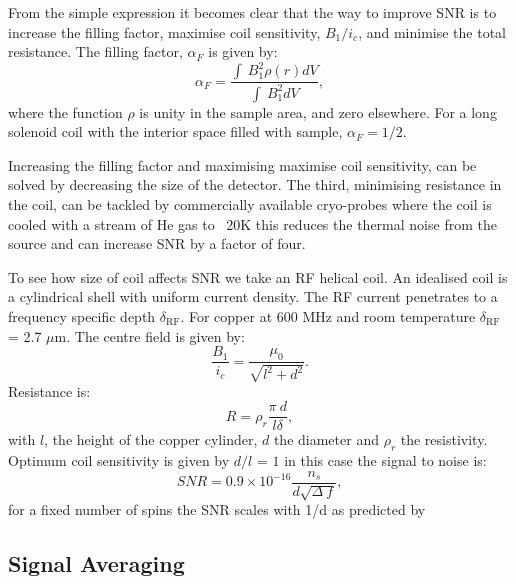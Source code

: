 From the simple expression it becomes clear that the way to improve SNR is to increase the filling factor, maximise coil sensitivity,
$B_1/i_c$, and minimise the total resistance. The filling factor, $\alpha_F$ is given by:
\begin{equation}\label{eqn:FillingFactor}
  \alpha_F = \frac{\int~B_1^2\rho(r)dV}{\int~B_1^2dV},
\end{equation}
where the function $\rho$ is unity in the sample area, and zero elsewhere. For a long solenoid coil with the
interior space filled with sample, $\alpha_F = 1/2$.

Increasing the filling factor and maximising maximise coil sensitivity, can be solved by decreasing the size of
the detector. The third, minimising resistance in the coil,
can be tackled by commercially available cryo-probes where the coil is cooled with a stream of He gas to
~20K this reduces the thermal noise from the source and can increase SNR by a factor of four.

To see how size of coil affects SNR we take an RF helical coil. An idealised coil
is a cylindrical shell with uniform current density. The RF current penetrates to a frequency
specific depth $\delta_{\text{RF}}$. For copper at 600 MHz and room temperature $\delta_{\text{RF}}$ = 2.7 $\mu$m. The centre
field is given by:
\begin{equation}
  \frac{B_1}{i_c} = \frac{\mu_0}{\sqrt{l^2+d^2}}.
\end{equation}
Resistance is:
\begin{equation}
  R = \rho_r\frac{\pi~d}{l\delta},
\end{equation}
with $l$, the height of the copper cylinder, $d$ the diameter and $\rho_r$ the resistivity.
Optimum coil sensitivity is given by $d/l$ = $1$ in this case the signal to noise is:
\begin{equation}\label{eqn:1/d}
  SNR = 0.9\times10^{-16}\frac{n_s}{d\sqrt{\Delta~f}},
\end{equation}
for a fixed number of spins the SNR scales with 1/d as predicted by \citep{Hoult:1976dw}

\subsection{Signal Averaging}\label{Signal Averaging}

